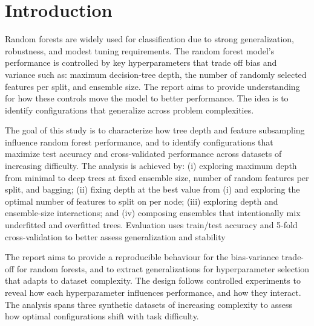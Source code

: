 \documentclass[conference]{IEEEtran}
\begin{document}
\section{Introduction}

Random forests are widely used for classification due to strong generalization, robustness, and modest tuning requirements. The random forest model's  
performance is controlled by key hyperparameters that trade off bias and variance such as: maximum decision-tree depth, the number of 
randomly selected features per split, and ensemble size. The report aims to provide understanding for how these controls move the model to better 
performance. The idea is to identify configurations that generalize across problem complexities.

The goal of this study is to characterize how tree depth and feature subsampling influence random forest performance, and to identify 
configurations that maximize test accuracy and cross-validated performance across datasets of increasing difficulty. The analysis is achieved by: 
(i) exploring maximum depth from minimal to deep trees at fixed ensemble size, number of random features per split, and bagging; (ii) fixing 
depth at the best value from (i) and exploring the optimal number of features to split on per node; (iii) exploring depth and ensemble-size 
interactions; and (iv) composing ensembles that intentionally mix underfitted and overfitted trees. Evaluation uses train/test accuracy and 
5-fold cross-validation to better assess generalization and stability

The report aims to provide a reproducible behaviour for the bias-variance trade-off for random forests, and to extract 
generalizations for hyperparameter selection that adapts to dataset complexity. The design follows controlled experiments to reveal 
how each hyperparameter influences performance, and how they interact. The analysis spans three synthetic datasets of increasing complexity to
assess how optimal configurations shift with task difficulty.
\end{document}
